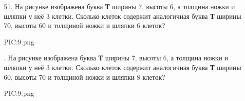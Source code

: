 51. На рисунке изображена буква {\bf Т} ширины 7, высоты 6, а толщина ножки и шляпки у неё 3 клетки. Сколько клеток содержит аналогичная буква {\bf Т} ширины 70, высоты 60 и толщиной ножки и шляпки 6 клеток?
\begin{center}
{{PIC:9.png}}
\end{center}
\newpage
{}. На рисунке изображена буква {\bf Т} ширины 7, высоты 6, а толщина ножки и шляпки у неё 3 клетки. Сколько клеток содержит аналогичная буква {\bf Т} ширины 60, высоты 70 и толщиной ножки и шляпки 8 клеток?
\begin{center}
{{PIC:9.png}}
\end{center}
